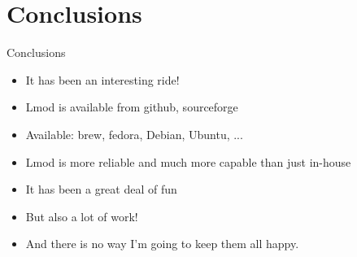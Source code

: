 \documentclass{beamer}
\begin{document}
\section{Conclusions}
\begin{frame}{Conclusions}
  \begin{itemize}
    \item It has been an interesting ride!
    \item Lmod is available from github, sourceforge
    \item Available: brew, fedora, Debian, Ubuntu, ...
    \item Lmod is more reliable and much more capable than just
      in-house
    \item It has been a great deal of fun
    \item But also a lot of work!
    \item And there is no way I'm going to keep them all happy.
  \end{itemize}
\end{frame}
\end{document}
